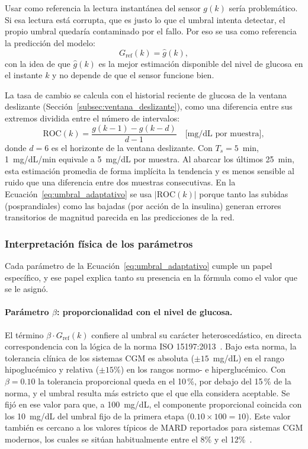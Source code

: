 \documentclass{report}
\begin{document}
Usar como referencia la lectura instantánea del sensor $g(k)$ sería problemático. Si esa lectura está corrupta, que es justo lo que el umbral intenta detectar, el propio umbral quedaría contaminado por el fallo. Por eso se usa como referencia la predicción del modelo:
\begin{equation}
\label{eq:g_ref}
G_{\mathrm{ref}}(k) = \hat{g}(k),
\end{equation}
con la idea de que $\hat{g}(k)$ es la mejor estimación disponible del nivel de glucosa en el instante $k$ y no depende de que el sensor funcione bien.

La tasa de cambio se calcula con el historial reciente de glucosa de la ventana deslizante (Sección~\ref{subsec:ventana_deslizante}), como una diferencia entre sus extremos dividida entre el número de intervalos:
\begin{equation}
\label{eq:roc}
\mathrm{ROC}(k) = \frac{g(k-1) - g(k-d)}{d - 1} \quad \big[\text{mg/dL por muestra}\big],
\end{equation}
donde $d = 6$ es el horizonte de la ventana deslizante. Con $T_s = 5$~min, 1~mg/dL/min equivale a 5~mg/dL por muestra. Al abarcar los últimos 25~min, esta estimación promedia de forma implícita la tendencia y es menos sensible al ruido que una diferencia entre dos muestras consecutivas. En la Ecuación~\eqref{eq:umbral_adaptativo} se usa $|\mathrm{ROC}(k)|$ porque tanto las subidas (posprandiales) como las bajadas (por acción de la insulina) generan errores transitorios de magnitud parecida en las predicciones de la red.

\subsubsection{Interpretación física de los parámetros}
\label{subsec:interpretacion_parametros}

Cada parámetro de la Ecuación~\eqref{eq:umbral_adaptativo} cumple un papel específico, y ese papel explica tanto su presencia en la fórmula como el valor que se le asignó.

\paragraph{Parámetro $\beta$: proporcionalidad con el nivel de glucosa.} El término $\beta \cdot G_{\mathrm{ref}}(k)$ confiere al umbral su carácter heteroscedástico, en directa correspondencia con la lógica de la norma ISO 15197:2013~\cite{iso15197_2013}. Bajo esta norma, la tolerancia clínica de los sistemas CGM es absoluta ($\pm 15$~mg/dL) en el rango hipoglucémico y relativa ($\pm 15\%$) en los rangos normo- e hiperglucémico. Con $\beta = 0.10$ la tolerancia proporcional queda en el 10\,\%, por debajo del 15\,\% de la norma, y el umbral resulta más estricto que el que ella considera aceptable. Se fijó en ese valor para que, a 100~mg/dL, el componente proporcional coincida con los 10~mg/dL del umbral fijo de la primera etapa ($0.10 \times 100 = 10$). Este valor también es cercano a los valores típicos de MARD reportados para sistemas CGM modernos, los cuales se sitúan habitualmente entre el 8\% y el 12\%~\cite{huang2022accuracy}.
\end{document}

